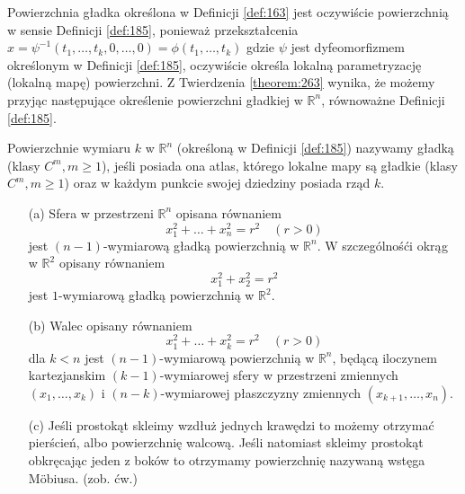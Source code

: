 \documentclass[leqno]{article}
\begin{document}
\begin{justify}
\begin{uwaga}
    Powierzchnia gładka określona w Definicji \ref{def:163} jest oczywiście powierzchnią w sensie Definicji \ref{def:185}, ponieważ 
    przekształcenia $x = \psi^{-1}(t_1, \ldots, t_k, 0, \ldots, 0) = \phi(t_1, \ldots, t_k)$ gdzie $\psi$ jest dyfeomorfizmem określonym 
    w Definicji \ref{def:185}, oczywiście określa lokalną parametryzację (lokalną mapę) powierzchni.
    Z Twierdzenia \ref{theorem:263} wynika, że możemy przyjąc następujące określenie powierzchni gładkiej w $\mathbb{R}^n$, równoważne Definicji \ref{def:185}.
\end{uwaga}

\begin{defn}
    Powierzchnie wymiaru $k$ w $\mathbb{R}^n$ (określoną w Definicji \ref{def:185}) nazywamy gładką (klasy $C^m, m \geqslant 1$), jeśli posiada ona 
    atlas, którego lokalne mapy są gładkie (klasy $C^m, m \geqslant 1$) oraz w każdym punkcie swojej dziedziny posiada rząd $k$.
\end{defn}

\begin{ex}
    \begin{itemize}
        \item [(a)] Sfera w przestrzeni $\mathbb{R}^n$ opisana równaniem 
        \[
            x_1^2 + \ldots + x_n^2 = r^2 \quad (r > 0)
        \]
        jest $(n-1)$-wymiarową gładką powierzchnią w $\mathbb{R}^n$. W szczególnośći okrąg w $\mathbb{R}^2$ opisany równaniem 
        \[
            x_1^2 + x_2^2 = r^2
        \]
        jest $1$-wymiarową gładką powierzchnią w $\mathbb{R}^2$.
        \item [(b)]
            Walec opisany równaniem 
            \[
                x_1^2 + \ldots + x^2_k = r^2 \quad (r > 0)
            \]
            dla $k < n$ jest $(n-1)$-wymiarową powierzchnią w $\mathbb{R}^n$, będącą iloczynem kartezjanskim $(k-1)$-wymiarowej sfery w przestrzeni zmiennych $(x_1, \ldots, x_k)$ i 
            $(n-k)$-wymiarowej płaszczyzny zmiennych $(x_{k+1}, \ldots, x_n)$.
        \item [(c)]
            Jeśli prostokąt skleimy wzdłuż jednych krawędzi to możemy otrzymać pierścień, albo powierzchnię walcową. Jeśli natomiast skleimy prostokąt obkręcając jeden z boków to otrzymamy 
            powierzchnię nazywaną wstęga Möbiusa. (zob. ćw.)
    \end{itemize}
\end{ex}












\end{justify}
\end{document}
